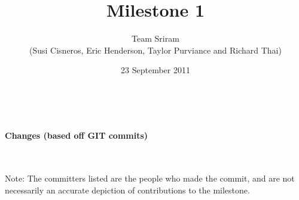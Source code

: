 \documentclass{article}
\begin{document}
\setlength{\voffset}{3.5in}
\title{Milestone 1}
\author{Team Sriram\\
(Susi Cisneros, Eric Henderson, Taylor Purviance and Richard Thai)}
\date{23 September 2011}
\maketitle
\clearpage
\setlength{\voffset}{0pt}
\tableofcontents
\clearpage
~\\
\begin{Large}\textbf{Changes (based off GIT commits)}\end{Large}\\
~\\
Note: The committers listed are the people who made the commit, and are not necessarily an accurate depiction of contributions to the milestone.\\
~\\
\end{document}
